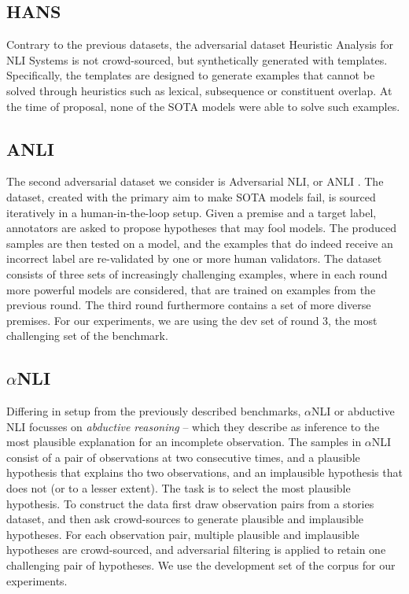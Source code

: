 \subsection{HANS}
Contrary to the previous datasets, the adversarial dataset Heuristic Analysis for NLI Systems \citep[HANS,][]{mccoy-etal-2019-right} is not crowd-sourced, but synthetically generated with templates.
Specifically, the templates are designed to generate examples that cannot be solved through heuristics such as lexical, subsequence or constituent overlap.
At the time of proposal, none of the SOTA models were able to solve such examples.

\subsection{ANLI}
The second adversarial dataset we consider is Adversarial NLI, or ANLI \citep{nie-etal-2020-adversarial}.
The dataset, created with the primary aim to make SOTA models fail, is sourced iteratively in a human-in-the-loop setup.
Given a premise and a target label, annotators are asked to propose hypotheses that may fool models.
The produced samples are then tested on a model, and the examples that do indeed receive an incorrect label are re-validated by one or more human validators.
The dataset consists of three sets of increasingly challenging examples, where in each round more powerful models are considered, that are trained on examples from the previous round.
The third round furthermore contains a set of more diverse premises.
For our experiments, we are using the dev set of round 3, the most challenging set of the benchmark.

\subsection{$\alpha$NLI}
Differing in setup from the previously described benchmarks, $\alpha$NLI or abductive NLI \citep{bhagavatula2020abductive} focusses on \emph{abductive reasoning} -- which they describe as inference to the most plausible explanation for an incomplete observation.
The samples in $\alpha$NLI consist of a pair of observations at two consecutive times, and a plausible hypothesis that explains tho two observations, and an implausible hypothesis that does not (or to a lesser extent).
The task is to select the most plausible hypothesis.
To construct the data \citet{bhagavatula2020abductive} first draw observation pairs from a stories dataset, and then ask crowd-sources to generate plausible and implausible hypotheses. 
For each observation pair, multiple plausible and implausible hypotheses are crowd-sourced, and adversarial filtering is applied to retain one challenging pair of hypotheses.
We use the development set of the corpus for our experiments.

